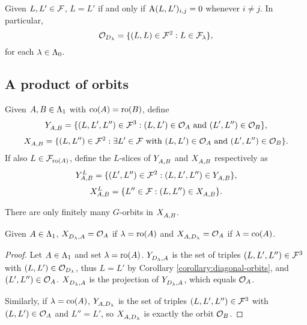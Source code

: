 \documentclass[a4paper, 11pt]{report}
\begin{document}
\begin{corollary}\label{corollary:diagonal-orbits}
Given $L,L'\in\flags$, $L=L'$ if and only if $\type{L}{L'}_{i,j}=0$ whenever $i\neq j$. In particular,
\begin{equation*}
\orbit{D_\lambda} = \{(L,L)\in\flags^2: L\in\flags_\lambda\},
\end{equation*}
for each $\lambda\in\compositions$.
\end{corollary}

\subsection{A product of orbits}

Given $A,B\in\matrices$ with $\co{A}=\ro{B}$, define
\begin{equation*}
\yprod{A,B} = \{ (L,L',L'')\in\flags^3: (L,L')\in\orbit{A} \text{ and } (L',L'')\in\orbit{B}\},
\end{equation*}
\begin{equation*}
\xprod{A,B} = \{(L,L'')\in\flags^2:\exists L'\in\flags\text{ with } (L,L')\in\orbit{A} \text{ and } (L',L'')\in\orbit{B}\}.
\end{equation*}
If also $L\in\flags_{\ro{A}}$, define the $L$-slices of $\yprod{A,B}$ and $\xprod{A,B}$ respectively as
\begin{equation*}
\yprod[L]{A,B} = \{(L',L'')\in\flags^2: (L,L',L'')\in\yprod{A,B}\},
\end{equation*}
\begin{equation*}
\xprod[L]{A,B} = \{L''\in\flags: (L,L'')\in\xprod{A,B}\}.
\end{equation*}

\begin{observation}
There are only finitely many $G$-orbits in $\xprod{A,B}$.
\end{observation}

\begin{lemma}\label{lemma:product-with-diagonal-orbits}
Given $A\in\matrices$, $\xprod{D_\lambda,A}=\orbit{A}$ if $\lambda=\ro{A}$ and $\xprod{A,D_\lambda}=\orbit{A}$ if $\lambda=\co{A}$.
\end{lemma}

\begin{proof}
Let $A\in\matrices$ and set $\lambda=\ro{A}$. $\yprod{D_\lambda,A}$ is the set of triples $(L,L',L'')\in\flags^3$ with $(L,L')\in\orbit{D_\lambda}$, thus $L=L'$ by Corollary \ref{corollary:diagonal-orbits}, and $(L',L'')\in\orbit{A}$. $\xprod{D_\lambda,A}$ is the projection of $\yprod{D_\lambda,A}$, which equals $\orbit{A}$.

Similarly, if $\lambda=\co{A}$, $\yprod{A,D_\lambda}$ is the set of triples $(L,L',L'')\in\flags^3$ with $(L,L')\in\orbit{A}$ and $L''=L'$, so $\xprod{A,D_\lambda}$ is exactly the orbit $\orbit{B}$.
\end{proof}
\end{document}
